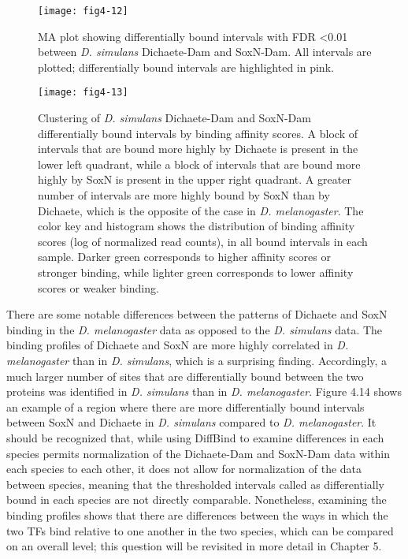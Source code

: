 \begin{figure}
\centering
\texttt{[image: fig4-12]}
\caption{MA plot showing differentially bound intervals with FDR \textless 0.01 between \emph{D. simulans} Dichaete-Dam and SoxN-Dam. All intervals are plotted; differentially bound intervals are highlighted in pink.}
\label{Figure 4.12}
\end{figure}

\begin{figure}
\centering
\texttt{[image: fig4-13]}
\caption{Clustering of \emph{D. simulans} Dichaete-Dam and SoxN-Dam differentially bound intervals by binding affinity scores. A block of intervals that are bound more highly by Dichaete is present in the lower left quadrant, while a block of intervals that are bound more highly by SoxN is present in the upper right quadrant. A greater number of intervals are more highly bound by SoxN than by Dichaete, which is the opposite of the case in \emph{D. melanogaster}. The color key and histogram shows the distribution of binding affinity scores (log of normalized read counts), in all bound intervals in each sample. Darker green corresponds to higher affinity scores or stronger binding, while lighter green corresponds to lower affinity scores or weaker binding.}
\label{Figure 4.13}
\end{figure}

There are some notable differences between the patterns of Dichaete and SoxN binding in the \emph{D. melanogaster} data as opposed to the \emph{D. simulans} data. The binding profiles of Dichaete and SoxN are more highly correlated in \emph{D. melanogaster} than in \emph{D. simulans}, which is a surprising finding. Accordingly, a much larger number of sites that are differentially bound between the two proteins was identified in \emph{D. simulans} than in \emph{D. melanogaster}. Figure 4.14 shows an example of a region where there are more differentially bound intervals between SoxN and Dichaete in \emph{D. simulans} compared to \emph{D. melanogaster}. It should be recognized that, while using DiffBind to examine differences in each species permits normalization of the Dichaete-Dam and SoxN-Dam data within each species to each other, it does not allow for normalization of the data between species, meaning that the thresholded intervals called as differentially bound in each species are not directly comparable. Nonetheless, examining the binding profiles shows that there are differences between the ways in which the two TFs bind relative to one another in the two species, which can be compared on an overall level; this question will be revisited in more detail in Chapter 5.\\

